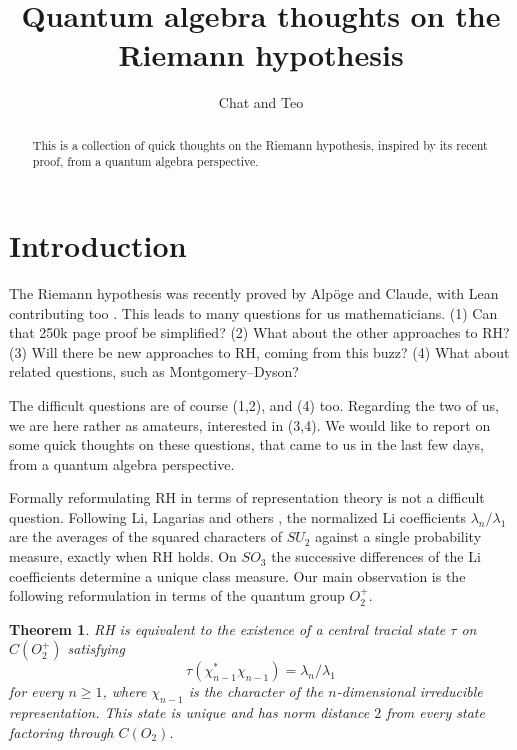 \documentclass[11pt,a4paper]{article}
\title{Quantum algebra thoughts on the Riemann hypothesis}
\author{Chat and Teo}
\date{}
\newtheorem*{introthm}{Theorem}
\begin{document}
\maketitle
\begin{abstract}
This is a collection of quick thoughts on the Riemann hypothesis, inspired by its recent proof, from a quantum algebra perspective.
\end{abstract}
\begingroup
\color{magenta}\hypersetup{linkcolor=magenta}
\setlength{\parskip}{0pt}
\renewcommand{\addvspace}[1]{\vspace{2pt}}
\tableofcontents
\endgroup
\section*{Introduction}
The Riemann hypothesis was recently proved by Alp\"oge and Claude, with Lean contributing too \cite{alpoge-claude}. This leads to many questions for us mathematicians. (1) Can that 250k page proof be simplified? (2) What about the other approaches to RH? (3) Will there be new approaches to RH, coming from this buzz? (4) What about related questions, such as Montgomery--Dyson?

The difficult questions are of course (1,2), and (4) too. Regarding the two of us, we are here rather as amateurs, interested in (3,4). We would like to report on some quick thoughts on these questions, that came to us in the last few days, from a quantum algebra perspective.

Formally reformulating RH in terms of representation theory is not a difficult question. Following Li, Lagarias and others \cite{arias,lagarias,li-ref,ms}, the normalized Li coefficients $\lambda_n/\lambda_1$ are the averages of the squared characters of $SU_2$ against a single probability measure, exactly when RH holds. On $SO_3$ the successive differences of the Li coefficients determine a unique class measure. Our main observation is the following reformulation in terms of the quantum group $O_2^+$.

\begin{introthm}
RH is equivalent to the existence of a central tracial state $\tau$ on $C(O_2^+)$ satisfying
\[
 \tau(\chi_{n-1}^*\chi_{n-1})=\lambda_n/\lambda_1
\]
for every $n\geq1$, where $\chi_{n-1}$ is the character of the $n$-dimensional irreducible representation. This state is unique and has norm distance $2$ from every state factoring through $C(O_2)$.
\end{introthm}
\end{document}
